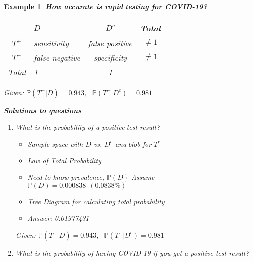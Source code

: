 \documentclass[12pt]{amsart}
\newtheorem{example}[theorem]{Example}
\begin{document}
\begin{example}  {\large \textbf{How accurate is rapid testing for COVID-19?} }
{\begin{itemize}
\begin{tabular}{| c| l| c | c | c |}
  \hline
             & $D$               & $D^c$           & Total\\                         
  \hline
  $T^+$ & sensitivity      & false positive & $\neq 1$ \\
  $T^-$ & false negative & specificity & $\neq 1$ \\
    \hline
   Total  & 1              & 1           & \\                         
  \hline  
\end{tabular}


\end{itemize}

\newpage
Given: $\mathbb{P}(T^+|D) = 0.943$, $\ \ \mathbb{P}(T^-|D^c) = 0.981$ %

\vspace{0.5cm}
\textbf{Solutions to questions} %
\begin{enumerate}
\item What is the probability of a positive test result?

\vspace{2cm}
\begin{itemize}
	\item Sample space with $D$ vs. $D^c$ and blob for $T^c$
	\item Law of Total Probability
	\item Need to know prevalence, $\mathbb{P}(D)$ \newline
	Assume $\mathbb{P}(D) = 0.000838\ \  (0.0838\%)$
	\item Tree Diagram for calculating total probability
	\item Answer: 0.01977431
\end{itemize}

\newpage
Given: $\mathbb{P}(T^+|D) = 0.943$, $\ \ \mathbb{P}(T^-|D^c) = 0.981$ %

\vspace{0.5cm}
\item What is the probability of having COVID-19 if you get a positive test result?




\end{enumerate}}
\end{example}
\end{document}
